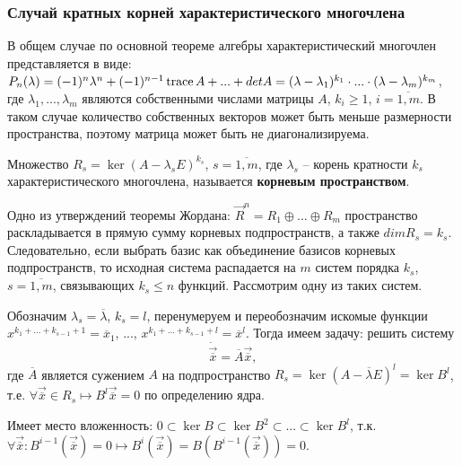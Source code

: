 \subsubsection*{Случай кратных корней характеристического многочлена}

В общем случае по основной теореме алгебры характеристический многочлен представляется в виде: 
$P_n (\lambda) = (-1)^n \lambda^n + (-1)^{n-1}\operatorname{trace} A + ... + det A = (\lambda - \lambda_1)^{k_1} \cdot ... \cdot (\lambda - \lambda_m)^{k_m}$, 
где $\lambda_1, ..., \lambda_m$ являются собственными числами матрицы $A$, $k_i \geq 1$, $i = \overline{1, m}$. 
В таком случае количество собственных векторов может быть меньше размерности пространства, поэтому матрица может быть не диагонализируема.

\begin{definition}
  Множество $R_s = \ker (A - \lambda_s E)^{k_s}$, $s = \overline{1, m}$, где $\lambda_s$ -- корень кратности $k_s$ характеристического многочлена, называется \textbf{корневым пространством}.
\end{definition}

Одно из утверждений теоремы Жордана: $\overrightarrow{R}^n = R_1 \oplus ... \oplus R_m $ пространство раскладывается в прямую сумму корневых подпространств, а также $dim R_s = k_s$.
Следовательно, если выбрать базис как объединение базисов корневых подпространств, то исходная система распадается на $m$ систем порядка $k_s$, $s = \overline{1, m}$, связывающих $k_s \leq n$ функций. Рассмотрим одну из таких систем.

Обозначим $\lambda_s = \overline{\lambda}$, $k_s = l$, перенумеруем и переобозначим искомые функции \\ $x^{k_1 + ... + k_{s-1} + 1} = \overline{x}_1$, ..., $x^{k_1 + ... + k_{s - 1} + l} = \overline{x}^l$.
Тогда имеем задачу: решить систему
\begin{equation}
  \dot{\overrightarrow{\overline{x}}} = \overline{A} \overrightarrow{\overline{x}},
\end{equation}
где $\overline{A}$ является сужением $A$ на подпространство $R_s = \ker (A - \overline{\lambda} E)^{l} = \ker B^l$, т.е. $\forall \overrightarrow{\overline{x}} \in R_s \mapsto B^l \overrightarrow{\overline{x}} = 0$ по определению ядра. 

Имеет место вложенность: $ 0 \subset \ker B \subset \ker B^2 \subset ... \subset \ker B^l$, 
т.к. $\forall \overrightarrow{\overline{x}}: B^{i-1}(\overrightarrow{\overline{x}}) = 0 \mapsto B^{i}(\overrightarrow{\overline{x}}) = B(B^{i-1}(\overrightarrow{\overline{x}})) = 0$.

